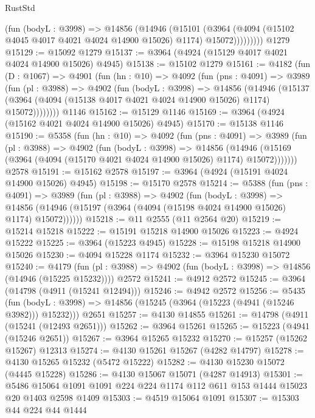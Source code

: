 \begin{lexlean}{RustStd}
\begin{coremodule}
{\begin{coremodule}
{{{{{{{{{{{{{{{{{{{{{{{{{{{{{{{{{{{{{{              (fun (bodyL : @3998) =>
              @14856
                (@14946
                  (@15101
                    (@3964
                      (@4094 (@15102 @4045 @4017 @4021 @4024 @14900 @15026) @1174)
                      @15072)))))))))
    @1279
@15129 := @15092 @1279
@15137 := @3964 (@4924 (@15129 @4017 @4021 @4024 @14900 @15026) @4945)
@15138 := @15102 @1279
@15161 := @4182
    (fun (D : @1067) =>
    @4901
      (fun (hn : @10) =>
      @4092
        (fun (pns : @4091) =>
        @3989
          (fun (pl : @3988) =>
          @4902
            (fun (bodyL : @3998) =>
            @14856
              (@14946
                (@15137 (@3964 (@4094 (@15138 @4017 @4021 @4024 @14900 @15026) @1174) @15072))))))))
    @1146
@15162 := @15129 @1146
@15169 := @3964 (@4924 (@15162 @4021 @4024 @14900 @15026) @4945)
@15170 := @15138 @1146
@15190 := @5358
    (fun (hn : @10) =>
    @4092
      (fun (pns : @4091) =>
      @3989
        (fun (pl : @3988) =>
        @4902
          (fun (bodyL : @3998) =>
          @14856
            (@14946 (@15169 (@3964 (@4094 (@15170 @4021 @4024 @14900 @15026) @1174) @15072)))))))
    @2578
@15191 := @15162 @2578
@15197 := @3964 (@4924 (@15191 @4024 @14900 @15026) @4945)
@15198 := @15170 @2578
@15214 := @5388
    (fun (pns : @4091) =>
    @3989
      (fun (pl : @3988) =>
      @4902
        (fun (bodyL : @3998) =>
        @14856 (@14946 (@15197 (@3964 (@4094 (@15198 @4024 @14900 @15026) @1174) @15072))))))
@15218 := @11 @2555 (@11 @2564 @20)
@15219 := @15214 @15218
@15222 := @15191 @15218 @14900 @15026
@15223 := @4924 @15222
@15225 := @3964 (@15223 @4945)
@15228 := @15198 @15218 @14900 @15026
@15230 := @4094 @15228 @1174
@15232 := @3964 @15230 @15072
@15240 := @4179
    (fun (pl : @3988) => @4902 (fun (bodyL : @3998) => @14856 (@14946 (@15225 @15232))))
    @2572
@15241 := @4912 @2572
@15245 := @3964 (@14798 (@4911 (@15241 @12494)))
@15246 := @4942 @2572
@15256 := @5435
    (fun (bodyL : @3998) => @14856 (@15245 (@3964 (@15223 (@4941 (@15246 @3982))) @15232)))
    @2651
@15257 := @4130 @14855
@15261 := @14798 (@4911 (@15241 (@12493 @2651)))
@15262 := @3964 @15261
@15265 := @15223 (@4941 (@15246 @2651))
@15267 := @3964 @15265 @15232
@15270 := @15257 (@15262 @15267) @12313
@15274 := @4130 @15261 @15267 (@4282 @14797)
@15278 := @4130 @15265 @15232 (@5472 @15222)
@15282 := @4130 @15230 @15072 (@4445 @15228)
@15286 := @4130 @15067 @15071 (@4287 @14913)
@15301 := @5486 @15064 @1091 @1091 @224 @224 @1174 @112 @611 @153 @1444 @15023 @20 @1403 @2598 @1409
@15303 := @4519 @15064 @1091
@15307 := @15303 @44 @224 @44 @1444
}}}}}}}}}}}}}}}}}}}}}}}}}}}}}}}}}}}}}}
\end{coremodule}}
\end{coremodule}
\end{lexlean}
